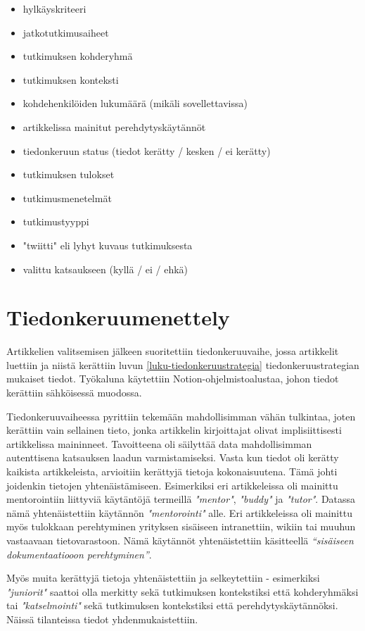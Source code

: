 \documentclass[utf8]{gradu3}
\begin{document}
\begin{itemize}
    \item hylkäyskriteeri
    \item jatkotutkimusaiheet
    \item tutkimuksen kohderyhmä
    \item tutkimuksen konteksti
    \item kohdehenkilöiden lukumäärä (mikäli sovellettavissa)
    \item artikkelissa mainitut perehdytyskäytännöt
    \item tiedonkeruun status (tiedot kerätty / kesken / ei kerätty)
    \item tutkimuksen tulokset
    \item tutkimusmenetelmät
    \item tutkimustyyppi
    \item "twiitti" eli lyhyt kuvaus tutkimuksesta
    \item valittu katsaukseen (kyllä / ei / ehkä)
\end{itemize}

\section{Tiedonkeruumenettely}

Artikkelien valitsemisen jälkeen suoritettiin tiedonkeruuvaihe, jossa artikkelit luettiin ja niistä kerättiin luvun \ref{luku-tiedonkeruustrategia} tiedonkeruustrategian mukaiset tiedot. Työkaluna käytettiin Notion-ohjelmistoalustaa, johon tiedot kerättiin sähköisessä muodossa. 

Tiedonkeruuvaiheessa pyrittiin tekemään mahdollisimman vähän tulkintaa, joten kerättiin vain sellainen tieto, jonka artikkelin kirjoittajat olivat implisiittisesti artikkelissa maininneet. Tavoitteena oli säilyttää data mahdollisimman autenttisena katsauksen laadun varmistamiseksi. Vasta kun tiedot oli kerätty kaikista artikkeleista, arvioitiin kerättyjä tietoja kokonaisuutena. Tämä johti joidenkin tietojen yhtenäistämiseen. Esimerkiksi eri artikkeleissa oli mainittu mentorointiin liittyviä käytäntöjä termeillä \textit{"mentor"}, \textit{"buddy"} ja \textit{"tutor"}. Datassa nämä yhtenäistettiin käytännön \textit{"mentorointi"} alle. Eri artikkeleissa oli mainittu myös tulokkaan perehtyminen yrityksen sisäiseen intranettiin, wikiin tai muuhun vastaavaan tietovarastoon. Nämä käytännöt yhtenäistettiin käsitteellä \textit{“sisäiseen dokumentaatiooon perehtyminen”}.

Myös muita kerättyjä tietoja yhtenäistettiin ja selkeytettiin - esimerkiksi \textit{"juniorit"} saattoi olla merkitty sekä tutkimuksen kontekstiksi että kohderyhmäksi tai \textit{"katselmointi"} sekä tutkimuksen kontekstiksi että perehdytyskäytännöksi. Näissä tilanteissa tiedot yhdenmukaistettiin.
\end{document}
